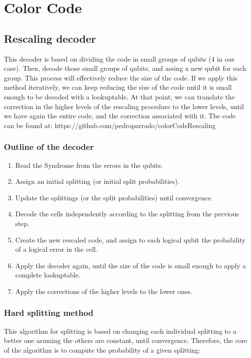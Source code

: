 \documentclass[a4paper,12pt]{article}
\begin{document}
\newpage

\section{Color Code}
\subsection{Rescaling decoder}
This decoder is based on dividing the code in small groups of qubits (4 in our case). Then, decode those small groups of qubits, and assing a new qubit for each group. This process will effectively reduce the size of the code. If we apply this method iteratively, we can keep reducing the size of the code until it is small enough to be decoded with a lookuptable. At that point, we can translate the correction in the higher levels of the rescaling procedure to the lower levels, until we have again the entire code, and the correction associated with it. The code can be found at: https://github.com/pedroparrado/colorCodeRescaling


\subsubsection{Outline of the decoder}

\begin{enumerate}
\item Read the Syndrome from the errors in the qubits.
\item Assign an initial splitting (or initial split probabilities).
\item Update the splittings (or the split probabilities) until convergence.
\item Decode the cells independently according to the splitting from the previous step.
\item Create the new rescaled code, and assign to each logical qubit the probability of a logical error in the cell.
\item Apply the decoder again, until the size of the code is small enough to apply a complete lookuptable.
\item Apply the corrections of the higher levels to the lower ones.


\end{enumerate}

\subsubsection{Hard splitting method}
This algorithm for splitting is based on changing each individual splitting to a better one asuming the others are constant, until convergence. Therefore, the core of the algorithm is to compute the probability of a given splitting:
\end{document}
